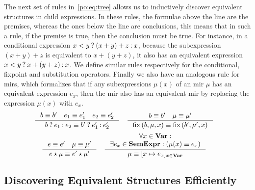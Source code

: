 The next set of rules in~\eqref{po:eq:tree} allows us to inductively discover
equivalent structures in child expressions.  In these rules, the formulae above
the line are the premises, whereas the ones below the line are conclusions,
this means that in such a rule, if the premise is true, then the conclusion
must be true.  For instance, in a conditional expression $x < y\mathbin{?}(x
+ y) + z\mathbin{:} x$, because the subexpression $(x + y) + z$ is equivalent to $x
+ (y + z)$, it also has an equivalent expression $x < y\mathbin{?} x + (y +
z)\mathbin{:} x$.  We define similar rules respectively for the conditional, fixpoint
and substitution operators.  Finally we also have an analogous rule for
\glspl{mir}, which formalizes that if any subexpressions $\mu(x)$ of an
\gls{mir} $\mu$ has an equivalent expression $e_x$, then the \gls{mir} also has
an equivalent \gls{mir} by replacing the expression $\mu(x)$ with $e_x$.
\begin{equation}
    \begin{aligned}
        \inference{%
            b \eqrel b^\prime \quad
            e_1 \eqrel e^\prime_1 \quad
            e_2 \eqrel e^\prime_2
        }{%
            \select{b}{e_1}{e_2} \eqrel
            \select{b^\prime}{e^\prime_1}{e^\prime_2}
        }
        & \quad
        \inference{%
            b \eqrel b^\prime \quad
            \mu \eqrel \mu^\prime
        }{%
            \fixpoint{b, \mu, x} \eqrel \fixpoint{b^\prime, \mu^\prime, x}
        }
    \end{aligned}
    \nonumber
\end{equation}
\vspace{-10pt}
\begin{equation}
    \begin{aligned}
        \inference{%
            e \eqrel e^\prime \quad
            \mu \eqrel \mu^\prime
        }{%
            e \expand \mu \eqrel e^\prime \expand \mu^\prime
        }
        & \quad
        \inference{%
            \forall x \in \varset: \\
            \exists e_x \in \sexprset:
            \left( \mu(x) \eqrel e_x \right)
        }{%
            \mu \eqrel [x \mapsto e_x]_{x \in \varset}
        }
    \end{aligned}
    \label{po:eq:tree}
\end{equation}

\subsection{Discovering Equivalent Structures Efficiently}

